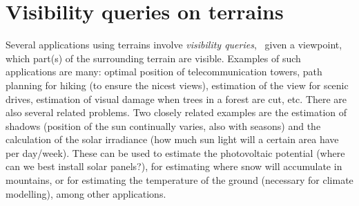 
\setchapterpreamble[u]{\margintoc}


\chapter{Visibility queries on terrains}%
\label{chap:visibility}

\graphicspath{{visibility/}}




Several applications using terrains involve \emph{visibility queries}, \ie\ given a viewpoint, which part(s) of the surrounding terrain are visible.
Examples of such applications are many: optimal position of telecommunication towers, path planning for hiking (to ensure the nicest views), estimation of the view for scenic drives, estimation of visual damage when trees in a forest are cut, etc.
There are also several related problems.
Two closely related examples are the estimation of shadows (position of the sun continually varies, also with seasons) and the calculation of the solar irradiance (how much sun light will a certain area have per day/week).
These can be used to estimate the photovoltaic potential (where can we best install solar panels?), for estimating where snow will accumulate in mountains, or for estimating the temperature of the ground (necessary for climate modelling), among other applications.

%

